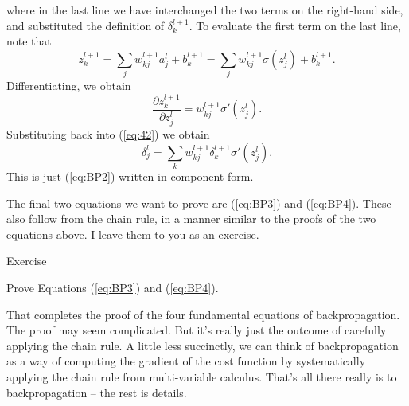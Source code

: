 \documentclass[a4paper,twoside,10pt]{book}
\begin{document}
where in the last line we have interchanged the two terms on the right-hand side, and substituted the definition of $\delta^{l+1}_k$. To evaluate the first term on the last line, note that
\begin{equation}
	z^{l+1}_k = \sum_j w^{l+1}_{kj} a^l_j +b^{l+1}_k = \sum_j w^{l+1}_{kj} \sigma(z^l_j) +b^{l+1}_k.
	\tag{43}\label{eq:43}
\end{equation}
Differentiating, we obtain
\begin{equation}
	\frac{\partial z^{l+1}_k}{\partial z^l_j} = w^{l+1}_{kj} \sigma'(z^l_j).
	\tag{44}\label{eq:44}
\end{equation}
Substituting back into (\ref{eq:42}) we obtain
\begin{equation}
	\delta^l_j = \sum_k w^{l+1}_{kj}  \delta^{l+1}_k \sigma'(z^l_j).
	\tag{45}\label{eq:45}
\end{equation}%
This is just (\ref{eq:BP2}) written in component form.

The final two equations we want to prove are (\ref{eq:BP3}) and (\ref{eq:BP4}). These also follow from the chain rule, in a manner similar to the proofs of the two equations above. I leave them to you as an exercise.

\begin{exercize}{Exercise}
	\item Prove Equations (\ref{eq:BP3}) and (\ref{eq:BP4}).
\end{exercize}
That completes the proof of the four fundamental equations of backpropagation. The proof may seem complicated. But it's really just the outcome of carefully applying the chain rule. A little less succinctly, we can think of backpropagation as a way of computing the gradient of the cost function by systematically applying the chain rule from multi-variable calculus. That's all there really is to backpropagation -- the rest is details.
\end{document}
